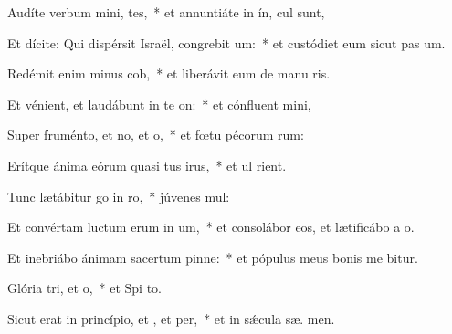 \item Audíte verbum mini, tes,~* et annuntiáte in ín,  cul sunt,
\item Et dícite: Qui dispérsit Israël, congrebit um:~* et custódiet eum sicut pas  um.
\item Redémit enim minus cob,~* et liberávit eum de manu ris.
\item Et vénient, et laudábunt in te on:~* et cónfluent   mini,
\item Super fruménto, et no, et o,~* et fœtu pécorum  rum:
\item Erítque ánima eórum quasi tus irus,~* et ul  rient.
\item Tunc lætábitur go in ro,~* júvenes   mul:
\item Et convértam luctum erum in um,~* et consolábor eos, et lætificábo a  o.
\item Et inebriábo ánimam sacertum pinne:~* et pópulus meus bonis me bitur.
\item Glória tri, et o,~* et Spi to.
\item Sicut erat in princípio, et , et per,~* et in sǽcula sæ. men.
